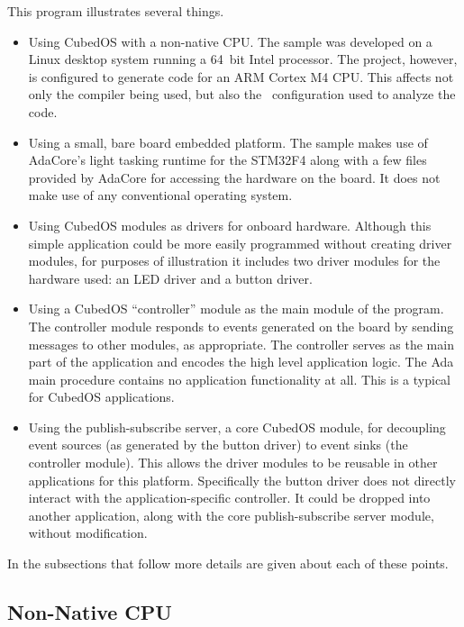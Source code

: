 This program illustrates several things.
\begin{itemize}

  \item Using CubedOS with a non-native CPU. The sample was developed on a Linux desktop system
  running a 64~bit Intel processor. The project, however, is configured to generate code for an
  ARM Cortex M4 CPU. This affects not only the compiler being used, but also the \SPARK\
  configuration used to analyze the code.

  \item Using a small, bare board embedded platform. The sample makes use of AdaCore's light
  tasking runtime for the STM32F4 along with a few files provided by AdaCore for accessing the
  hardware on the board. It does not make use of any conventional operating system.

  \item Using CubedOS modules as drivers for onboard hardware. Although this simple application
  could be more easily programmed without creating driver modules, for purposes of illustration
  it includes two driver modules for the hardware used: an LED driver and a button driver.

  \item Using a CubedOS ``controller'' module as the main module of the program. The controller
  module responds to events generated on the board by sending messages to other modules, as
  appropriate. The controller serves as the main part of the application and encodes the high
  level application logic. The Ada main procedure contains no application functionality at all.
  This is a typical for CubedOS applications.

  \item Using the publish-subscribe server, a core CubedOS module, for decoupling event sources
  (as generated by the button driver) to event sinks (the controller module). This allows the
  driver modules to be reusable in other applications for this platform. Specifically the button
  driver does not directly interact with the application-specific controller. It could be
  dropped into another application, along with the core publish-subscribe server module, without
  modification.

\end{itemize}

In the subsections that follow more details are given about each of these points.

\subsection{Non-Native CPU}

